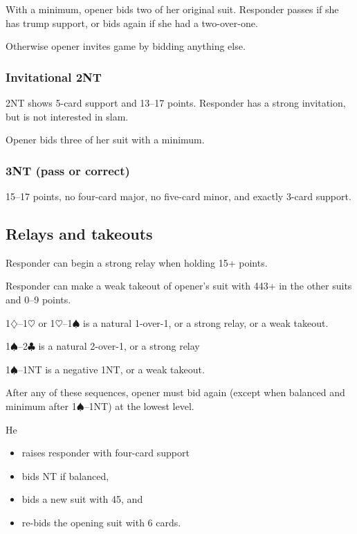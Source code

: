 \documentclass[a4paper, twoside, 11pt]{article}
\begin{document}
\begin{multicols}{3}
With a minimum, opener bids two of her original suit. Responder passes if she has trump support, or bids again if she had a two-over-one.

Otherwise opener invites game by bidding anything else.

\subsubsection*{Invitational 2NT}
2NT shows 5-card support and 13--17 points. Responder has a strong invitation, but is not interested in slam.

Opener bids three of her suit with a minimum.

\subsubsection*{3NT (pass or correct)}
15--17 points, no four-card major, no five-card minor, and exactly 3-card support.

\subsection*{Relays and takeouts}

Responder can begin a strong relay when holding 15+ points.

Responder can make a weak takeout of opener's suit with 443+ in the other suits and 0--9 points.

 1$\diamondsuit$--1$\heartsuit$ or 1$\heartsuit$--1$\spadesuit$ is a natural 1-over-1, or a strong relay, or a weak takeout.

1$\spadesuit$--2$\clubsuit$ is a natural 2-over-1, or a strong relay

1$\spadesuit$--1NT is a negative 1NT, or a weak takeout.

After any of these sequences, opener must bid again (except when balanced and minimum after 1$\spadesuit$--1NT) at the lowest level.

He
\begin{itemize}
    \item raises responder with
four-card support
\item bids NT if balanced,
\item bids a new
suit with 45, and
\item re-bids the opening suit
with 6 cards.
\end{itemize}


\end{multicols}
\end{document}
